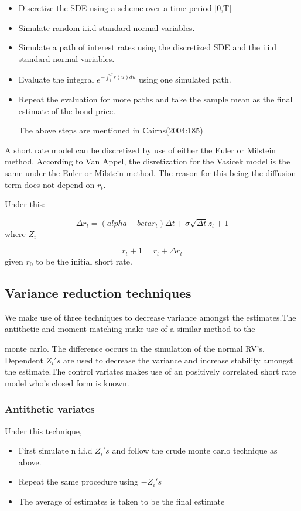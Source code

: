 \documentclass[12pt,a4paper]{article}
\begin{document}
\begin{itemize}
	\item Discretize the SDE using a scheme over a time period [0,T]
	\item Simulate random i.i.d standard normal variables.
	\item Simulate a path of interest rates using the discretized SDE and the i.i.d standard normal variables.
	\item Evaluate the integral $e^{-\int_{t}^{T} r(u)du}$ using one simulated path.
	\item Repeat the evaluation for more paths and take the sample mean as the final estimate of the bond price.
	
	The above steps are mentioned in Cairns(2004:185)
\end{itemize}

A short rate model can be discretized by use of either the Euler or Milstein method. According to Van Appel, the disretization for the Vasicek model is the same under the Euler or Milstein method. The reason for this being the diffusion term does not depend on $r_t$. 

Under this:

$$ \Delta r_t= (alpha-beta r_t)\Delta t+ \sigma \sqrt{\Delta t} z_t+1$$ where $Z_i$

$$r_t+1=r_t+\Delta r_t$$ given $r_0$ to be the initial short rate.


\subsection{Variance reduction techniques}

We make use of three techniques to decrease variance amongst the estimates.The antithetic and moment matching make use of a similar method to the 



monte carlo. The difference occurs in the simulation of the normal RV's. Dependent $Z_i's$  are used to decrease the variance and increase stability amongst the estimate.The control variates makes use of an positively correlated short rate model who's closed form is known.    


\subsubsection{Antithetic variates}

Under this technique, 

\begin{itemize}
	\item First simulate n i.i.d $Z_i's$ and follow the crude monte carlo technique as above.
	\item Repeat the same procedure using  $-Z_i's$
	\item The average of estimates is taken to be the final estimate 
\end{itemize}
\end{document}

